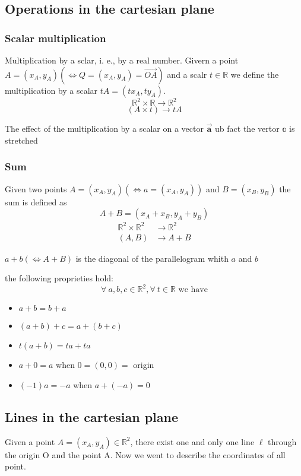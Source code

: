 \subsection{Operations in the cartesian plane}
\subsubsection{Scalar multiplication}
Multiplication by a sclar, i. e., by a real number. Givern a point $A = (x_A, y_A)(\Leftrightarrow Q = (x_A, y_A) = \vec{OA})$ and a scalr $t\in \mathbb{R}$ we define the multiplication by a scalar $tA = (tx_A, ty_A)$. 
$$\mathbb{R}^2 \times\mathbb{R} \longrightarrow \mathbb{R}^2$$
$$(A\times t) \longrightarrow tA$$

The effect of the multiplication by a scalar on a vector $\vec{\textbf{a}}$ ub fact the vertor $\mathbb{a}$ is stretched

\subsubsection{Sum}
Given two points $A = (x_A, y_A)( \Leftrightarrow a = (x_A, y_A))$ and $B= (x_B,y_B)$ the sum is defined as
$$A+B = (x_A+x_B, y_A+y_B)$$
\begin{align*}
\mathbb{R}^2 \times \mathbb{R}^2 &\longrightarrow \mathbb{R}^2\\
(A,B) &\longrightarrow A+B
\end{align*}

$a + b (\Leftrightarrow A+B)$ is the diagonal of the parallelogram whith $a$ and $b$ 

the following proprieties hold:
$$\forall \ a, b, c \in \mathbb{R}^2, \forall \ t \in \mathbb{R} \text{ we have}$$
\begin{itemize}
    \item $a+b = b+a$
    \item $(a+b) + c = a + (b+ c)$
    \item $t(a+b)=ta + ta$
    \item $a + 0 = a$ when $0 = (0,0) =$ origin
    \item $(-1)a = -a$ when $a+(-a)=0$
\end{itemize}
\subsection{Lines in the cartesian plane}
Given a point $A = (x_A, y_A) \in \mathbb{R}^2$, there exist one and only one line $\ell$ through the origin O and the point A. Now we went to describe the coordinates of all point. 

